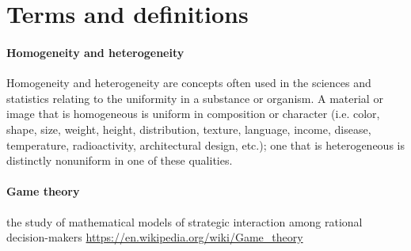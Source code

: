 \documentclass{article}
\begin{document}
			
	\section{Terms and definitions}
		\paragraph{Homogeneity and heterogeneity} Homogeneity and heterogeneity are concepts often used in the sciences and statistics relating to the uniformity in a substance or organism. A material or image that is homogeneous is uniform in composition or character (i.e. color, shape, size, weight, height, distribution, texture, language, income, disease, temperature, radioactivity, architectural design, etc.); one that is heterogeneous is distinctly nonuniform in one of these qualities.
		\paragraph{Game theory}
		the study of mathematical models of strategic interaction among rational decision-makers
		\url{https://en.wikipedia.org/wiki/Game_theory}
	
\end{document}
